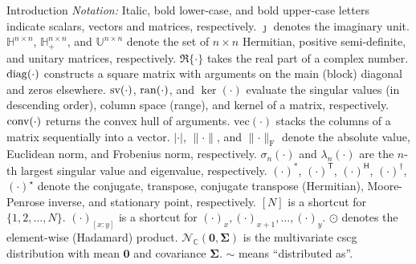 \documentclass[journal]{IEEEtran}
\begin{document}
\begin{section}{Introduction}
	\emph{Notation:}
	Italic, bold lower-case, and bold upper-case letters indicate scalars, vectors and matrices, respectively.
	$\jmath$ denotes the imaginary unit.
	$\mathbb{H}^{n \times n}$, $\mathbb{H}_+^{n \times n}$, and $\mathbb{U}^{n \times n}$ denote the set of $n \times n$ Hermitian, positive semi-definite, and unitary matrices, respectively.
	$\Re\{\cdot\}$ takes the real part of a complex number.
	$\operatorname{diag}(\cdot)$ constructs a square matrix with arguments on the main (block) diagonal and zeros elsewhere.
	$\operatorname{sv}(\cdot)$, $\operatorname{ran}(\cdot)$, and $\ker(\cdot)$ evaluate the singular values (in descending order), column space (range), and kernel of a matrix, respectively.
	$\operatorname{conv}(\cdot)$ returns the convex hull of arguments.
	$\mathrm{vec}(\cdot)$ stacks the columns of a matrix sequentially into a vector.
	$\lvert \cdot \rvert$, $\lVert \cdot \rVert$, and $\lVert \cdot \rVert _\mathrm{F}$ denote the absolute value, Euclidean norm, and Frobenius norm, respectively.
	$\sigma_n(\cdot)$ and $\lambda_n(\cdot)$ are the $n$-th largest singular value and eigenvalue, respectively.
	$(\cdot)^*$, $(\cdot)^\mathsf{T}$, $(\cdot)^\mathsf{H}$, $(\cdot)^\dagger$, $(\cdot)^{\star}$ denote the conjugate, transpose, conjugate transpose (Hermitian), Moore-Penrose inverse, and stationary point, respectively.
	$[N]$ is a shortcut for $\{1,2,\ldots,N\}$.
	$(\cdot)_{[x:y]}$ is a shortcut for $(\cdot)_x,(\cdot)_{x+1},\ldots,(\cdot)_y$.
	$\odot$ denotes the element-wise (Hadamard) product.
	$\mathcal{N}_{\mathbb{C}}(\mathbf{0}, \mathbf{\Sigma})$ is the multivariate \gls{cscg} distribution with mean $\mathbf{0}$ and covariance $\mathbf{\Sigma}$.
	$\sim$ means ``distributed as''.
\end{section}
\end{document}
